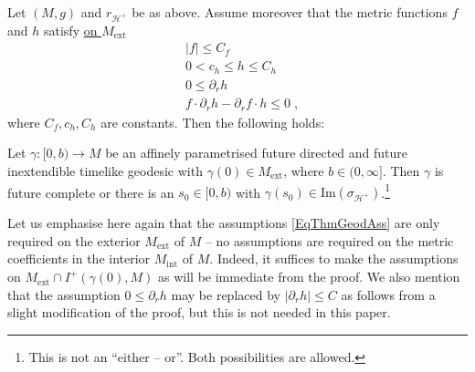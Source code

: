 \documentclass[reqno]{article}
\newcommand{\Hp}{\mathcal{H}^+}
\newcommand{\Mext}{M_{\mathrm{ext}}}
\newcommand{\rd}{\partial}
\begin{document}
\begin{theorem} \label{ThmGeod}
Let $(M,g)$ and $r_{\Hp}$ be as above. Assume moreover that the metric functions $f$ and $h$ satisfy \underline{on $\Mext$}
\begin{equation}
\label{EqThmGeodAss}
\begin{aligned}
&| f| \leq C_f \\
&0 < c_h \leq h \leq C_h \\
&0 \leq \rd_r h \\
&f \cdot \rd_r h - \rd_r f \cdot h \leq 0 \;,
\end{aligned}
\end{equation}
where $C_f, c_h, C_h$ are constants.
Then the following holds: 

Let $\gamma : [0,b) \to M$ be an affinely parametrised future directed and future inextendible timelike geodesic with $\gamma(0) \in \Mext$, where $b \in (0, \infty]$. Then $\gamma$ is future complete or there is an $s_0 \in [0,b)$ with $\gamma(s_0) \in \mathrm{Im}(\sigma_{\Hp})$.\footnote{This is not an ``either -- or''. Both possibilities are allowed.}
\end{theorem}
\begin{remark} \label{RemAppe}
Let us emphasise here again that the assumptions \eqref{EqThmGeodAss} are only required on the exterior $\Mext$ of $M$ -- no assumptions are required on the metric coefficients in the interior $M_{\mathrm{int}}$ of $M$. Indeed, it suffices to make the assumptions on $\Mext \cap I^+(\gamma(0),M)$ as will be immediate from the proof. We also mention that the assumption $0 \leq \rd_r h$ may be replaced by $| \rd_r h| \leq C$ as follows from a slight modification of the proof, but this is not needed in this paper.
\end{remark}
\end{document}
